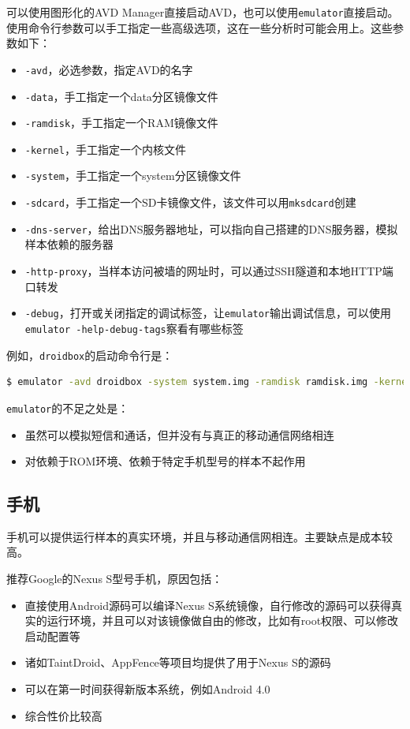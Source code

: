 可以使用图形化的AVD Manager直接启动AVD，也可以使用\lstinline!emulator!直接启动。使用命令行参数可以手工指定一些高级选项，这在一些分析时可能会用上。这些参数如下：
\begin{itemize}
\item \lstinline!-avd!，必选参数，指定AVD的名字
\item \lstinline!-data!，手工指定一个data分区镜像文件
\item \lstinline!-ramdisk!，手工指定一个RAM镜像文件
\item \lstinline!-kernel!，手工指定一个内核文件
\item \lstinline!-system!，手工指定一个system分区镜像文件
\item \lstinline!-sdcard!，手工指定一个SD卡镜像文件，该文件可以用\lstinline!mksdcard!创建
\item \lstinline!-dns-server!，给出DNS服务器地址，可以指向自己搭建的DNS服务器，模拟样本依赖的服务器
\item \lstinline!-http-proxy!，当样本访问被墙的网址时，可以通过SSH隧道和本地HTTP端口转发
\item \lstinline!-debug!，打开或关闭指定的调试标签，让\lstinline!emulator!输出调试信息，可以使用\lstinline!emulator -help-debug-tags!察看有哪些标签
\end{itemize}
例如，\lstinline!droidbox!的启动命令行是：
\begin{lstlisting}[language=bash, numbers=none]
 $ emulator -avd droidbox -system system.img -ramdisk ramdisk.img -kernel zImage -prop dalvik.vm.execution-mode=int:portable
\end{lstlisting}

\lstinline!emulator!的不足之处是：
\begin{itemize}
\item 虽然可以模拟短信和通话，但并没有与真正的移动通信网络相连
\item 对依赖于ROM环境、依赖于特定手机型号的样本不起作用
\end{itemize}

\subsection{手机}
手机可以提供运行样本的真实环境，并且与移动通信网相连。主要缺点是成本较高。

推荐Google的Nexus S型号手机，原因包括：
\begin{itemize}
  \item 直接使用Android源码可以编译Nexus S系统镜像，自行修改的源码可以获得真实的运行环境，并且可以对该镜像做自由的修改，比如有root权限、可以修改启动配置等
  \item 诸如TaintDroid、AppFence等项目均提供了用于Nexus S的源码
  \item 可以在第一时间获得新版本系统，例如Android 4.0
  \item 综合性价比较高
\end{itemize}


